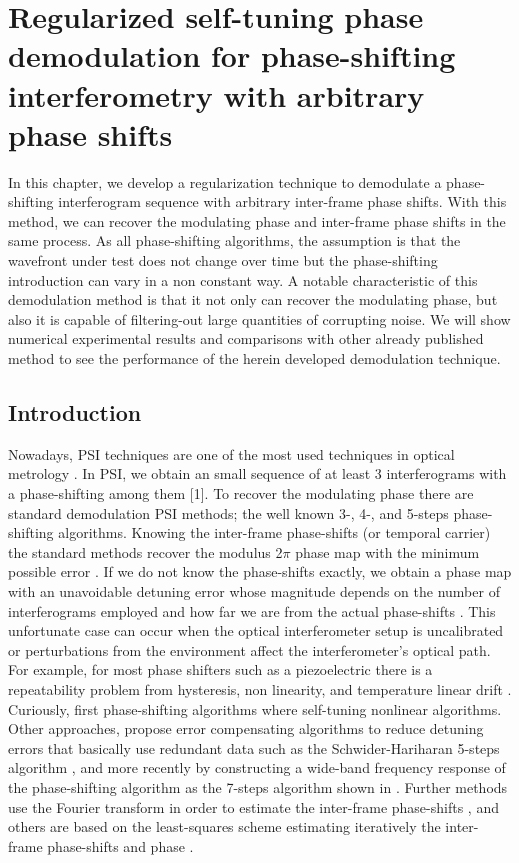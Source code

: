 \chapter{Regularized self-tuning phase demodulation for phase-shifting
interferometry with arbitrary phase shifts}

In this chapter, we develop a regularization technique to demodulate
a phase-shifting interferogram sequence with arbitrary inter-frame
phase shifts. With this method, we can recover the modulating phase
and inter-frame phase shifts in the same process. As all phase-shifting
algorithms, the assumption is that the wavefront under test does not
change over time but the phase-shifting introduction can vary in a
non constant way. A notable characteristic of this demodulation method
is that it not only can recover the modulating phase, but also it
is capable of filtering-out large quantities of corrupting noise.
We will show numerical experimental results and comparisons with other
already published method to see the performance of the herein developed
demodulation technique.

\section{Introduction}

Nowadays, PSI techniques are one of
the most used techniques in optical metrology \cite{Malacara}. In PSI, we
obtain an small sequence of at least 3 interferograms with a phase-shifting
among them {[}1{]}. To recover the modulating phase there are standard
demodulation PSI methods; the well known 3-, 4-, and 5-steps phase-shifting
algorithms. Knowing the inter-frame phase-shifts (or temporal carrier)
the standard methods recover the modulus 2$\pi$ phase map with the
minimum possible error \cite{Malacara,Freischlad:90,Servin:09}. If we
do not know the phase-shifts exactly, we obtain a phase map with an
unavoidable detuning error whose magnitude depends on the number of
interferograms employed and how far we are from the actual phase-shifts
\cite{Servin:09,Schwider:83,Ai:87,Larkin:01,Langoju:06}. This unfortunate case
can occur when the optical
interferometer setup is uncalibrated or perturbations from the environment
affect the interferometer\textquoteright{}s optical path. For example,
for most phase shifters such as a piezoelectric there is a repeatability 
problem from hysteresis, non linearity, and temperature linear drift
\cite{Ai:87,Cheng:85}.
Curiously, first phase-shifting algorithms where self-tuning nonlinear
algorithms. Other approaches, propose error compensating
algorithms to reduce detuning errors that basically use redundant
data such as the Schwider-Hariharan 5-steps algorithm
\cite{Schwider:83,Hariharan:87,Surrel:93},
and more recently by constructing a wide-band frequency response of
the phase-shifting algorithm as the 7-steps algorithm shown in
\cite{Estrada:09}.
Further methods use the Fourier transform in order to estimate the
inter-frame phase-shifts \cite{Larkin:01,Lai:91}, and others are based on the
least-squares scheme estimating iteratively the inter-frame phase-shifts
and phase \cite{Kong,Wang:04}.

